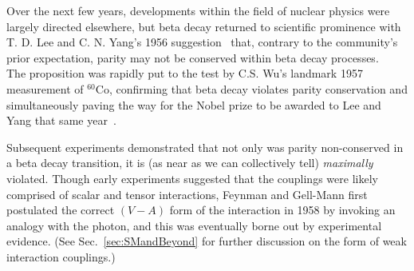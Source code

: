 Over the next few years, developments within the field of nuclear physics were largely directed elsewhere, but beta decay returned to scientific prominence with T. D. Lee and C. N. Yang's 1956 suggestion~ 
that, contrary to the community's prior expectation, parity may not be conserved within beta decay processes\cite{LeeYang}.
~  The proposition was rapidly put to the test by C.S. Wu's landmark 1957 measurement of $^{60}$Co, confirming that beta decay violates parity conservation and simultaneously paving the way for the Nobel prize to be awarded to Lee and Yang that same year~\cite{wu}.~
~

Subsequent experiments demonstrated that not only was parity non-conserved in a beta decay transition, it is (as near as we can collectively tell) \emph{maximally} violated.  
Though early experiments suggested that the couplings were likely comprised of 
scalar and tensor interactions, Feynman and Gell-Mann first postulated the correct $(V-A)$ form of the interaction in 1958 by invoking an analogy with the photon, and this was eventually borne out by experimental evidence\cite{FeynmanGellMann1958}.  (See Sec.~\ref{sec:SMandBeyond} for further discussion on the form of weak interaction couplings.)

